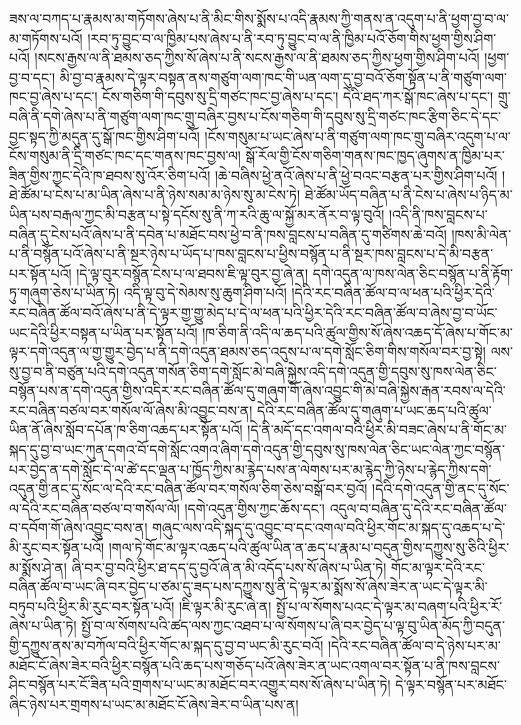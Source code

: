 ཟས་ལ་བཀད་པ་རྣམས་མ་གཏོགས་ཞེས་པ་ནི་མིང་གིས་སྨོས་པ་འདི་རྣམས་ཀྱི་གནས་ན་འདུག་པ་ནི་ཕྱག་བྱ་བ་ལ་མ་གཏོགས་པའོ། །རབ་ཏུ་བྱུང་བ་ལ་ཁྱིམ་པས་ཞེས་པ་ནི་རབ་ཏུ་བྱུང་བ་ལ་ནི་ཁྱིམ་པའོ་ཅོག་གིས་ཕྱག་གྱིས་ཤིག་པའོ། །སངས་རྒྱས་ལ་ནི་ཐམས་ཅད་ཀྱིས་སོ་ཞེས་པ་ནི་སངས་རྒྱས་ལ་ནི་ཐམས་ཅད་ཀྱིས་ཕྱག་གྱིས་ཤིག་པའོ། །ཕྱག་བྱ་བ་དང་། མི་བྱ་བ་རྣམས་དེ་ལྟར་བསྟན་ནས་གཙུག་ལག་ཁང་གི་ཡན་ལག་དུ་བྱ་བའོ་ཅོག་སྟོན་པ་ནི་གཙུག་ལག་ཁང་བྱ་ཞེས་པ་དང་། ངོས་གཅིག་གི་དབུས་སུ་དྲི་གཙང་ཁང་བྱ་ཞེས་པ་དང་། དེའི་ཐད་ཀར་སྒོ་ཁང་ཞེས་པ་དང་། གྲུ་བཞི་ནི་དགེ་ཞེས་པ་ནི་གཙུག་ལག་ཁང་གྲུ་བཞིར་བྱས་པ་ངོས་གཅིག་གི་དབུས་སུ་དྲི་གཙང་ཁང་རྩིག་ཅིང་དེ་དང་བྱང་སྟད་ཀྱི་མདུན་དུ་སྒོ་ཁང་གྱིས་ཤིག་པའོ། །ངོས་གསུམ་པ་ཡང་ཞེས་པ་ནི་གཙུག་ལག་ཁང་གྲུ་བཞིར་འདུག་པ་ལ་ངོས་གསུམ་ནི་དྲི་གཙང་ཁང་དང་གནས་ཁང་བྱས་ལ། སྒོ་རོལ་གྱི་ངོས་གཅིག་གནས་ཁང་ཁྱད་ཞུགས་ན་ཁྱིམ་པར་ཟིན་གྱིས་ཀྱང་དེའི་ཁ་ཐབས་སུ་འོར་ཅིག་པའོ། །ཆེ་བཞིས་ཕྱེ་ནའོ་ཞེས་པ་ནི་ཕྱེ་བའང་བརྩན་པར་གྱིས་ཤིག་པའོ། །
ཐེ་ཚོམ་པ་ངེས་པ་མ་ཡིན་ཞེས་པ་ནི་ཉེས་སམ་མ་ཉེས་སུ་མ་ངེས་ཏེ། ཐེ་ཚོམ་ཡོད་བཞིན་པ་ནི་ངེས་པ་ཞེས་པ་ཉིད་མ་ཡིན་པས་བརྒལ་ཀྱང་མི་བརྩན་པ་སྟེ་དངོས་སུ་ནི་ཀ་རའི་ཆུ་ལ་སྐྱོ་མར་ནོར་བ་ལྟ་བུའོ། །འདི་ནི་ཁས་བླངས་པ་བཞིན་དུ་ངེས་པའོ་ཞེས་པ་ནི་དབེན་པ་མཐོང་བས་ཕྱེ་བ་ནི་ཁས་བླངས་པ་བཞིན་དུ་གཙིགས་ཆེ་བའོ། །ཁས་མི་ལེན་པ་ནི་བསྙོན་པའོ་ཞེས་པ་ནི་སྔར་ཉེས་པ་ཡོད་པ་ཁས་བླངས་པ་ཕྱིས་བསྙོན་པ་ནི་སྔར་ཁས་བླངས་པ་དེ་མི་བརྩན་པར་སྟོན་པའོ། །དེ་ལྟ་བུར་བསྙོན་ངེས་པ་ལ་ཐབས་ཇི་ལྟ་བུར་བྱ་ཞེ་ན། དགེ་འདུན་ལ་ཁས་ལེན་ཅིང་བསྙོན་པ་ནི་རྟོག་ཏུ་གཞུག་ཅེས་པ་ཡིན་ཏེ། འདི་ལྟ་བུ་དེ་སེམས་སུ་ཆུག་ཤིག་པའོ། །དེའི་རང་བཞིན་ཚོལ་བ་ལ་ཕན་པའི་ཕྱིར་དེའི་རང་བཞིན་ཚོལ་བའོ་ཞེས་པ་ནི་དེ་ལྟར་གྱ་གྱུ་མེད་པ་དེ་ལ་ཕན་པའི་ཕྱིར་དེའི་རང་བཞིན་ཚོལ་བ་ཞེས་བྱ་བ་ཡོང་ཡང་དེའི་ཕྱིར་བསྟན་པ་ཡིན་པར་སྟོན་པའོ། །ཁ་ཅིག་ནི་འདི་ལ་ཆད་པའི་ཚུལ་གྱིས་སོ་ཞེས་འཆད་དོ་ཞེས་པ་གོང་མ་ལྟར་དགེ་འདུན་ལ་གྱ་གྱུར་བྱེད་པ་ནི་དགེ་འདུན་ཐམས་ཅད་འདུས་པ་ལ་དགེ་སློང་ཅིག་གིས་གསོལ་བར་བྱ་སྟེ། ལས་སུ་བྱ་བ་ནི་བཙུན་པའི་དགེ་འདུན་གསོན་ཅིག་དགེ་སློང་མེ་བཞི་སྐྱེས་འདི་དགེ་འདུན་གྱི་དབུས་སུ་ཁས་ལེན་ཅིང་བསྙོན་པས་ན་དགེ་འདུན་གྱིས་འདིར་རང་བཞིན་ཚོལ་དུ་གཞུག་གོ་ཞེས་འབྱུང་གི་མེ་བཞི་སྐྱེས་རྒན་རབས་ལ་དེའི་རང་བཞིན་བཙལ་བར་གསོལ་ལོ་ཞེས་མི་འབྱུང་བས་ན། དེའི་རང་བཞིན་ཚོལ་དུ་གཞུག་པ་ཡང་ཆད་པའི་ཚུལ་ཡིན་ནོ་ཞེས་སློབ་དཔོན་ཁ་ཅིག་འཆད་པར་སྟོན་པའོ། །དེ་ནི་མདོ་དང་འགལ་བའི་ཕྱིར་མི་བཟང་ཞེས་པ་ནི་གོང་མ་སྐད་དུ་བྱ་བ་ཡང་ཀུན་དགའ་བོ་དགེ་སློང་འགའ་ཞིག་དགེ་འདུན་གྱི་དབུས་སུ་ཁས་ལེན་ཅིང་ཡང་ལེན་ཀྱང་བསྙོན་པར་བྱེད་ན་དགེ་སློང་དེ་ལ་ཚེ་དང་ལྡན་པ་ཁྱོད་ཀྱིས་མ་རྙེད་པས་ན་ལེགས་པར་མ་རྙེད་ཀྱི་ཉེས་པ་རྙེད་ཀྱིས་དགེ་འདུན་གྱི་ནང་དུ་སོང་ལ་དེའི་རང་བཞིན་ཚོལ་བར་གསོལ་ཅིག་ཅེས་བསྒོ་བར་བྱའོ། །དེའི་དགེ་འདུན་གྱི་ནང་དུ་སོང་ལ་དེའི་རང་བཞིན་བཙལ་བ་གསོལ་ལོ། །དགེ་འདུན་གྱིས་ཀྱང་ཆོས་དང་། འདུལ་བ་བཞིན་དུ་དེའི་རང་བཞིན་ཚོལ་བ་དབོག་གོ་ཞེས་འབྱུང་བས་ན། གཞུང་ལས་འདི་སྐད་དུ་འབྱུང་བ་དང་འགལ་བའི་ཕྱིར་གོང་མ་སྐད་དུ་འཆད་པ་དེ་མི་རུང་བར་སྟོན་པའོ། །གལ་ཏེ་གོང་མ་ལྟར་འཆད་པའི་ཚུལ་ཡིན་ན་ཆད་པ་རྣམ་པ་བདུན་གྱིས་དཀྱུས་སུ་ཅིའི་ཕྱིར་མ་སྨོས་ཤེ་ན། ཞི་བར་བྱ་བའི་ཕྱིར་ཐ་དད་དུ་བྱའོ་ཞེ་ན་མི་འདོད་པས་སོ་ཞེས་པ་ཡིན་ཏེ། གོང་མ་ལྟར་དེའི་རང་བཞིན་ཚོལ་བ་ཡང་ཞི་བར་བྱེད་པ་ཙམ་དུ་ཟད་པས་དཀྱུས་སུ་ནི་དེ་ལྟར་མ་སྨོས་སོ་ཞེས་ཟེར་ན་ཡང་དེ་ལྟར་མི་བཏུབ་པའི་ཕྱིར་མི་རུང་བར་སྟོན་པའོ། །ཇི་ལྟར་མི་རུང་ཞེ་ན། སྤྱོ་པ་ལ་སོགས་པའང་དེ་ལྟར་མ་བཞག་པའི་ཕྱིར་རོ་ཞེས་པ་ཡིན་ཏེ། སྤྱོ་བ་ལ་སོགས་པའི་ཚད་ལས་ཀྱང་འཐབ་པ་ལ་སོགས་པ་ཞི་བར་བྱེད་པ་ལྟ་བུ་ཡིན་མོད་ཀྱི་བདུན་གྱི་དཀྱུས་ནས་མ་བཀོལ་བའི་ཕྱིར་གོང་མ་སྐད་དུ་བྱ་བ་ཡང་མི་རུང་བའོ། །དེའི་རང་བཞིན་ཚོལ་བ་དེ་ཉེས་པར་མ་མཐོང་ངོ་ཞེས་ཟེར་བའི་ཕྱིར་བསྙོན་པའི་ཆད་པས་གཅོད་པའོ་ཞེས་ཟེར་ན་ཡང་འགལ་བར་སྟོན་པ་ནི་ཁས་བླངས་ཤིང་བསྙོན་པར་ངོ་ཟིན་པའི་གྲགས་པ་ཡང་མ་མཐོང་བར་འགྱུར་བས་སོ་ཞེས་པ་ཡིན་ཏེ། དེ་ལྟར་བསྙོན་པར་མཐོང་ཞིང་ཉེས་པར་གྲགས་པ་ཡང་མ་མཐོང་ངོ་ཞེས་ཟེར་བ་ཡིན་པས་ན། 
